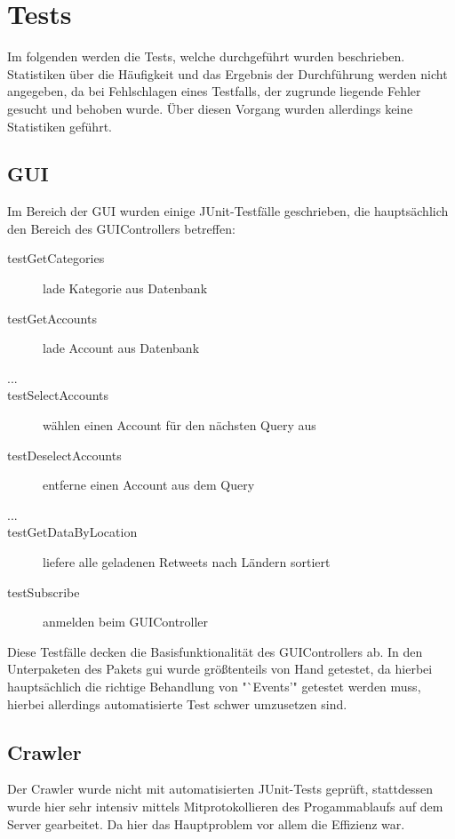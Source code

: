 \section{Tests}

Im folgenden werden die Tests, welche durchgeführt wurden beschrieben. Statistiken über die Häufigkeit und das Ergebnis der Durchführung werden nicht angegeben, da bei Fehlschlagen eines Testfalls, der zugrunde liegende Fehler gesucht und behoben wurde. Über diesen Vorgang wurden allerdings keine Statistiken geführt.

\subsection{GUI}

Im Bereich der GUI wurden einige JUnit-Testfälle geschrieben, die hauptsächlich den Bereich des GUIControllers betreffen:
\begin{description}
	\item[testGetCategories] lade Kategorie aus Datenbank
	\item[testGetAccounts] lade Account aus Datenbank
	\item[...]
	\item[testSelectAccounts] wählen einen Account für den nächsten Query aus
	\item[testDeselectAccounts] entferne einen Account aus dem Query
	\item[...]
	\item[testGetDataByLocation] liefere alle geladenen Retweets nach Ländern sortiert
	\item[testSubscribe] anmelden beim GUIController
\end{description}

Diese Testfälle decken die Basisfunktionalität des GUIControllers ab. In den Unterpaketen des Pakets gui wurde größtenteils von Hand getestet, da  hierbei hauptsächlich die richtige Behandlung von "`Events'" getestet werden muss, hierbei allerdings automatisierte Test schwer umzusetzen sind.


\subsection{Crawler}

Der Crawler wurde nicht mit automatisierten JUnit-Tests geprüft, stattdessen wurde hier sehr intensiv mittels Mitprotokollieren des Progammablaufs auf dem Server gearbeitet. Da hier das Hauptproblem vor allem die Effizienz war.


